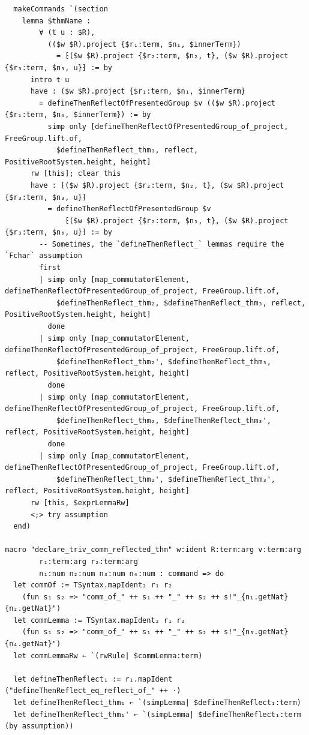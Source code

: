 \begin{Verbatim}
  makeCommands `(section
    lemma $thmName :
        ∀ (t u : $R),
          (($w $R).project {$r₁:term, $n₁, $innerTerm})
            = ⁅($w $R).project {$r₂:term, $n₂, t}, ($w $R).project {$r₃:term, $n₃, u}⁆ := by
      intro t u
      have : ($w $R).project {$r₁:term, $n₁, $innerTerm}
        = defineThenReflectOfPresentedGroup $v (($w $R).project {$r₁:term, $n₄, $innerTerm}) := by
          simp only [defineThenReflectOfPresentedGroup_of_project, FreeGroup.lift.of,
            $defineThenReflect_thm₁, reflect, PositiveRootSystem.height, height]
      rw [this]; clear this
      have : ⁅($w $R).project {$r₂:term, $n₂, t}, ($w $R).project {$r₃:term, $n₃, u}⁆
          = defineThenReflectOfPresentedGroup $v
              ⁅($w $R).project {$r₂:term, $n₅, t}, ($w $R).project {$r₃:term, $n₆, u}⁆ := by
        -- Sometimes, the `defineThenReflect_` lemmas require the `Fchar` assumption
        first
        | simp only [map_commutatorElement, defineThenReflectOfPresentedGroup_of_project, FreeGroup.lift.of,
            $defineThenReflect_thm₂, $defineThenReflect_thm₃, reflect, PositiveRootSystem.height, height]
          done
        | simp only [map_commutatorElement, defineThenReflectOfPresentedGroup_of_project, FreeGroup.lift.of,
            $defineThenReflect_thm₂', $defineThenReflect_thm₃, reflect, PositiveRootSystem.height, height]
          done
        | simp only [map_commutatorElement, defineThenReflectOfPresentedGroup_of_project, FreeGroup.lift.of,
            $defineThenReflect_thm₂, $defineThenReflect_thm₃', reflect, PositiveRootSystem.height, height]
          done
        | simp only [map_commutatorElement, defineThenReflectOfPresentedGroup_of_project, FreeGroup.lift.of,
            $defineThenReflect_thm₂', $defineThenReflect_thm₃', reflect, PositiveRootSystem.height, height]
      rw [this, $exprLemmaRw]
      <;> try assumption
  end)

macro "declare_triv_comm_reflected_thm" w:ident R:term:arg v:term:arg
        r₁:term:arg r₂:term:arg
        n₁:num n₂:num n₃:num n₄:num : command => do
  let commOf := TSyntax.mapIdent₂ r₁ r₂
    (fun s₁ s₂ => "comm_of_" ++ s₁ ++ "_" ++ s₂ ++ s!"_{n₁.getNat}{n₂.getNat}")
  let commLemma := TSyntax.mapIdent₂ r₁ r₂
    (fun s₁ s₂ => "comm_of_" ++ s₁ ++ "_" ++ s₂ ++ s!"_{n₃.getNat}{n₄.getNat}")
  let commLemmaRw ← `(rwRule| $commLemma:term)

  let defineThenReflect₁ := r₁.mapIdent ("defineThenReflect_eq_reflect_of_" ++ ·)
  let defineThenReflect_thm₁ ← `(simpLemma| $defineThenReflect₁:term)
  let defineThenReflect_thm₁' ← `(simpLemma| $defineThenReflect₁:term (by assumption))


\end{Verbatim}
